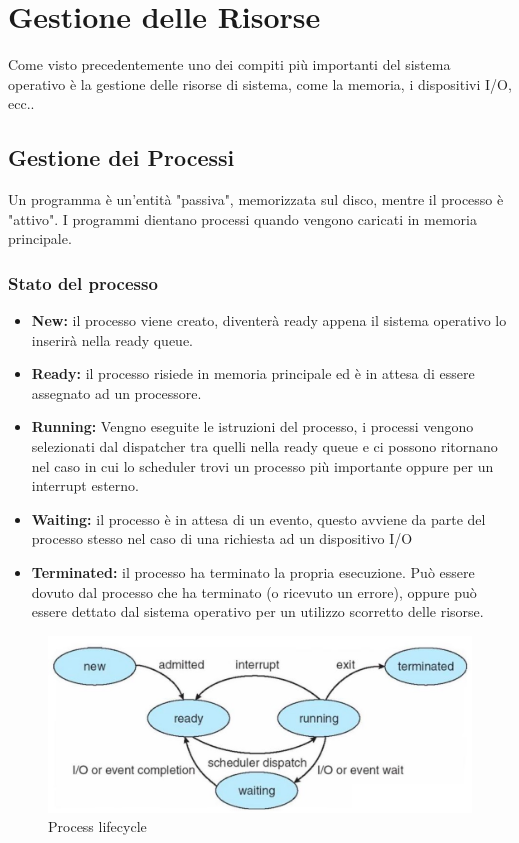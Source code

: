 \section{Gestione delle Risorse}

Come visto precedentemente uno dei compiti più importanti del sistema operativo è la gestione delle risorse di sistema, come la memoria, i dispositivi I/O, ecc..

\subsection{Gestione dei Processi}
Un programma è un'entità "passiva", memorizzata sul disco, mentre il processo è "attivo".
I programmi dientano processi quando vengono caricati in memoria principale.

\subsubsection*{Stato del processo}
\begin{itemize}
    \item \textbf{New:} il processo viene creato, diventerà ready appena il sistema operativo lo inserirà nella ready queue.
    \item \textbf{Ready:} il processo risiede in memoria principale ed è in attesa di essere assegnato ad un processore.
    \item \textbf{Running:} Vengno eseguite le istruzioni del processo, i processi vengono selezionati dal dispatcher tra quelli nella ready queue e ci possono ritornano nel caso in cui lo scheduler trovi un processo più importante oppure per un interrupt esterno.
    \item \textbf{Waiting:} il processo è in attesa di un evento, questo avviene da parte del processo stesso nel caso di una richiesta ad un dispositivo I/O
    \item \textbf{Terminated:} il processo ha terminato la propria esecuzione. Può essere dovuto dal processo che ha terminato (o ricevuto un errore), oppure può essere dettato dal sistema operativo per un utilizzo scorretto delle risorse.
\end{itemize}

\begin{figure}[H]
    \centering
    \includegraphics[width=0.6\linewidth]{assets/process.jpg}
    \caption{Process lifecycle}
\end{figure}

